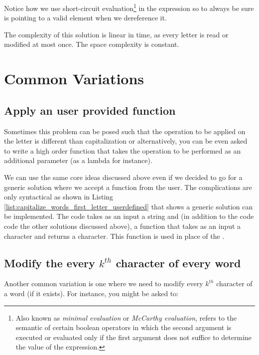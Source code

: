 Notice how we use short-circuit evaluation\footnote{
	Also known as \textit{minimal evaluation} or \textit{McCarthy evaluation}, refers to the semantic of certain boolean operators in which the second argument is executed or evaluated only if the first argument does not suffice to determine the value of the expression.}\cite{cit:wiki:shortcircuit}
in the  expression so to always be sure  is pointing to a valid element when we dereference it.

The complexity of this solution is linear in time, as every letter is read or modified at most once. The space complexity is constant.



\section{Common Variations}
\label{capitalize_words_first_letter:sec:variation}

\subsection{Apply an user provided function}
Sometimes this problem can be posed such that the operation to be applied on the letter is different than capitalization or alternatively, you can be even asked to write a high order function that takes the operation to be performed as an additional parameter (as a lambda for instance).

We can use the same core ideas discussed above even if we decided to go for a generic solution where we accept a function from the user. The complications are only syntactical as shown in 
Listing \ref{list:capitalize_words_first_letter_userdefined} that shows a generic solution can be implemented. The code takes as an input a string and (in addition to the code code the other solutions discussed above), a function  that takes as an input a character and returns a character. This function is used in place of the .



\subsection{Modify the every $k^{th}$ character of every word}
Another common variation is one where we need to modify every $k^{th}$ character of a word (if it exists). For instance, you might be asked to:

